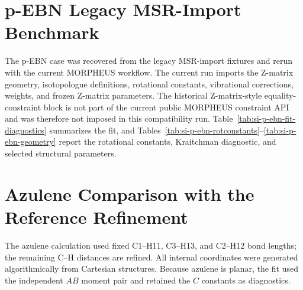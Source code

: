 \documentclass[12pt]{article}
\begin{document}
\section{p-EBN Legacy MSR-Import Benchmark}

The p-EBN case was recovered from the legacy MSR-import fixtures and rerun
with the current MORPHEUS workflow. The current run imports the Z-matrix
geometry, isotopologue definitions, rotational constants, vibrational
corrections, weights, and frozen Z-matrix parameters. The historical
Z-matrix-style equality-constraint block is not part of the current public MORPHEUS
constraint API and was therefore not imposed in this compatibility run.
Table~\ref{tab:si-p-ebn-fit-diagnostics} summarizes the fit, and
Tables~\ref{tab:si-p-ebn-rotconstants}--\ref{tab:si-p-ebn-geometry} report the
rotational constants, Kraitchman diagnostic, and selected structural
parameters.









\section{Azulene Comparison with the Reference Refinement}

The azulene calculation used fixed C1--H11, C3--H13, and C2--H12 bond lengths; the remaining C--H distances are refined. All internal coordinates were generated algorithmically from Cartesian structures. Because azulene is planar, the fit used the independent $AB$ moment pair and retained the $C$ constants as diagnostics. 
\end{document}
